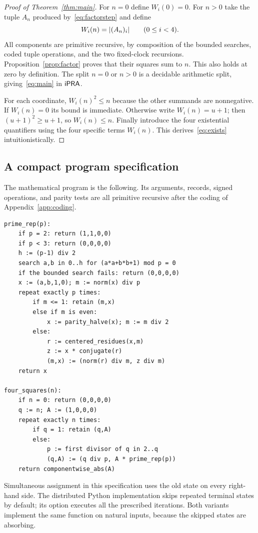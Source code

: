 \begin{proof}[Proof of Theorem~\ref{thm:main}]
For $n=0$ define $W_i(0)=0$. For $n>0$ take the tuple $A_n$ produced
by~\eqref{eq:factorstep} and define
\[
 W_i(n)=\lvert(A_n)_i\rvert\qquad(0\le i<4).
\]
All components are primitive recursive, by composition of the bounded
searches, coded tuple operations, and the two fixed-clock recursions.
Proposition~\ref{prop:factor} proves that their squares sum to $n$.
This also holds at zero by definition. The split $n=0$ or $n>0$ is
a decidable arithmetic split, giving~\eqref{eq:main} in $\mathsf{iPRA}$.

For each coordinate, $W_i(n)^2\le n$ because the other summands are
nonnegative. If $W_i(n)=0$ its bound is immediate. Otherwise write
$W_i(n)=u+1$; then $(u+1)^2\ge u+1$, so $W_i(n)\le n$.
Finally introduce the four existential quantifiers using the four
specific terms $W_i(n)$. This derives~\eqref{eq:exists} intuitionistically.
\end{proof}

\subsection{A compact program specification}

The mathematical program is the following. Its arguments, records, signed
operations, and parity tests are all primitive recursive after the coding
of Appendix~\ref{app:coding}.

\begin{lstlisting}
prime_rep(p):
    if p = 2: return (1,1,0,0)
    if p < 3: return (0,0,0,0)
    h := (p-1) div 2
    search a,b in 0..h for (a*a+b*b+1) mod p = 0
    if the bounded search fails: return (0,0,0,0)
    x := (a,b,1,0); m := norm(x) div p
    repeat exactly p times:
        if m <= 1: retain (m,x)
        else if m is even:
            x := parity_halve(x); m := m div 2
        else:
            r := centered_residues(x,m)
            z := x * conjugate(r)
            (m,x) := (norm(r) div m, z div m)
    return x

four_squares(n):
    if n = 0: return (0,0,0,0)
    q := n; A := (1,0,0,0)
    repeat exactly n times:
        if q = 1: retain (q,A)
        else:
            p := first divisor of q in 2..q
            (q,A) := (q div p, A * prime_rep(p))
    return componentwise_abs(A)
\end{lstlisting}

Simultaneous assignment in this specification uses the old state on every
right-hand side. The distributed Python implementation skips repeated
terminal states by default; its  option executes
all the prescribed iterations. Both variants implement the same function
on natural inputs, because the skipped states are absorbing.

